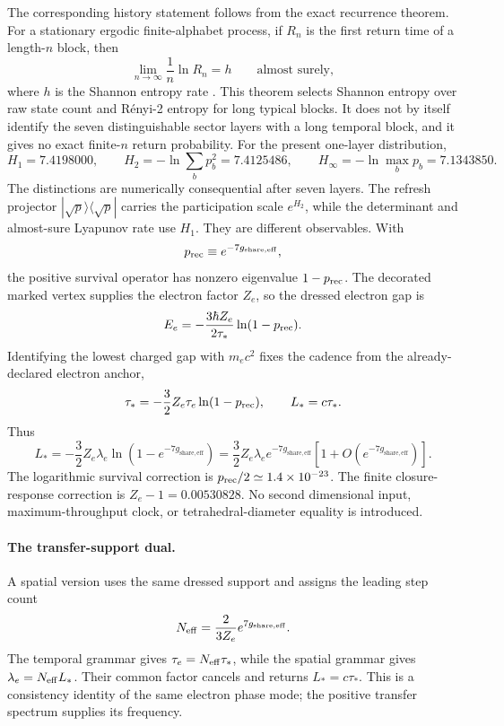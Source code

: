 \documentclass[11pt]{article}
\begin{document}
The corresponding history statement follows from the exact recurrence theorem. For a stationary ergodic finite-alphabet process, if $R_n$ is the first return time of a length-$n$ block, then
\[
\lim_{n\to\infty}\frac{1}{n}\ln R_n=h
\qquad\text{almost surely},
\]
where $h$ is the Shannon entropy rate \citep{WynerZiv1989,OrnsteinWeiss1993}. This theorem selects Shannon entropy over raw state count and R\'enyi-2 entropy for long typical blocks. It does not by itself identify the seven distinguishable sector layers with a long temporal block, and it gives no exact finite-$n$ return probability. For the present one-layer distribution,
\[
H_1=7.4198000,
\qquad
H_2=-\ln\sum_b p_b^2=7.4125486,
\qquad
H_\infty=-\ln\max_b p_b=7.1343850.
\]
The distinctions are numerically consequential after seven layers. The refresh projector $|\sqrt p\rangle\langle\sqrt p|$ carries the participation scale $e^{H_2}$, while the determinant and almost-sure Lyapunov rate use $H_1$. They are different observables. With
\[
p_{\rm rec}\equiv e^{-7g_{\mathrm{share,eff}}},
\]
the positive survival operator has nonzero eigenvalue $1-p_{\rm rec}$. The decorated marked vertex supplies the electron factor $Z_e$, so the dressed electron gap is
\[
E_e=-\frac{3\hbar Z_e}{2\tau_*}\ln(1-p_{\rm rec}).
\]
Identifying the lowest charged gap with $m_ec^2$ fixes the cadence from the already-declared electron anchor,
\[
\tau_*=-\frac32Z_e\tau_e\ln(1-p_{\rm rec}),
\qquad
L_*=c\tau_*.
\]
Thus
\[
L_*=-\frac32Z_e\lambda_e\ln\!\left(1-e^{-7g_{\mathrm{share,eff}}}\right)
=\frac32Z_e\lambda_e e^{-7g_{\mathrm{share,eff}}}
\left[1+O\!\left(e^{-7g_{\mathrm{share,eff}}}\right)\right].
\]
The logarithmic survival correction is $p_{\rm rec}/2\simeq1.4\times10^{-23}$. The finite closure-response correction is $Z_e-1=0.00530828$. No second dimensional input, maximum-throughput clock, or tetrahedral-diameter equality is introduced.

\paragraph{The transfer-support dual.}
A spatial version uses the same dressed support and assigns the leading step count
\[
N_{\rm eff}=\frac{2}{3Z_e}e^{7g_{\mathrm{share,eff}}}.
\]
The temporal grammar gives $\tau_e=N_{\rm eff}\tau_*$, while the spatial grammar gives $\lambda_e=N_{\rm eff}L_*$. Their common factor cancels and returns $L_*=c\tau_*$. This is a consistency identity of the same electron phase mode; the positive transfer spectrum supplies its frequency.
\end{document}

